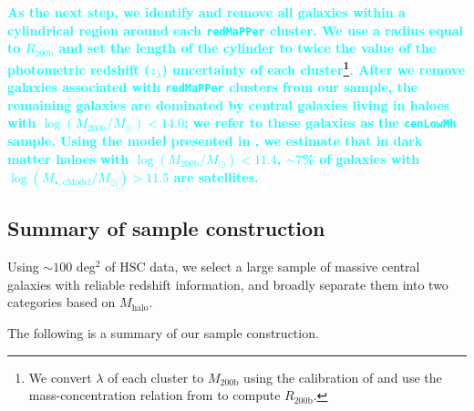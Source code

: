 \documentclass[fleqn,usenatbib]{mnras}
\def\redm{\texttt{redMaPPer}}
\def\nbcg{\texttt{cenLowMh}}
\def\logmh{{$\log (M_{\mathrm{200b}}/M_{\odot})$}}
\def\logmcmodel{{$\log (M_{\star,\mathrm{cModel}}/M_{\odot})$}}
\newcommand{\song}[1]{\textcolor{cyan}{\textbf{#1}}}
\begin{document}
    \song{
    As the next step, we identify and remove all galaxies within a cylindrical 
    region around each \redm{} cluster. 
    We use a radius equal to $R_{\mathrm{200b}}$ and set the length of the cylinder 
    to twice the value of the photometric redshift ($z_{\lambda}$) uncertainty 
    of each cluster\footnote{We convert $\lambda$ of each cluster to 
    $M_{\mathrm{200b}}$ using the calibration of \citet{Simet2016} and use the 
    mass-concentration relation from \citet{Diemer2015} to compute 
    $R_{\mathrm{200b}}$.}.
    After we remove galaxies associated with \redm{} clusters from our sample, 
    the remaining galaxies are dominated by central galaxies living in haloes with 
    \logmh{}$< 14.0$; we refer to these galaxies as the \nbcg{} sample.
    Using the model presented in \citet{Saito2016}, we estimate that in dark matter 
    haloes with \logmh$<11.4$, $\sim 7$\% of galaxies with \logmcmodel{}$>11.5$ are 
    satellites.
    }

\subsection{Summary of sample construction}
    \label{ssec:sample}

    Using ${\sim} 100$ deg$^2$ of HSC data, we select a large sample of massive central 
    galaxies with reliable redshift information, and broadly separate them into two 
    categories based on $M_{\mathrm{halo}}$.
    
    The following is a summary of our sample construction. 
        
\end{document}
